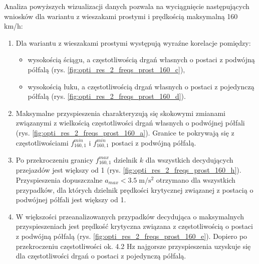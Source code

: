Analiza powyższych wizualizacji danych pozwala na wyciągnięcie następujących wniosków dla wariantu z wieszakami prostymi i prędkością maksymalną 160 km/h:
\begin{enumerate}
	
	\item Dla wariantu z wieszakami prostymi występują wyraźne korelacje pomiędzy:
	\begin{itemize}
		\item wysokością ściągu, a częstotliwością drgań własnych o postaci z podwójną półfalą (rys. \ref{fig:opti_res_2_freqs_prost_160_c}),
		\item wysokością łuku, a częstotliwością drgań własnych o postaci z pojedynczą półfalą (rys. \ref{fig:opti_res_2_freqs_prost_160_d}).
	\end{itemize}
	\item Maksymalne przyspieszenia charakteryzują się skokowymi zmianami związanymi z wielkością częstotliwości drgań własnych o podwójnej półfali (rys. \ref{fig:opti_res_2_freqs_prost_160_a}). Granice te pokrywają się z częstotliwościami $f_{160,1}^{min}$ i $f_{160,1}^{min}$ postaci z podwójną półfalą. 
	\item Po przekroczeniu granicy $f_{160,1}^{max}$  dzielnik $k$ dla wszystkich decydujących przejazdów jest większy od 1 (rys. \ref{fig:opti_res_2_freqs_prost_160_h}). Przyspieszenia dopuszczalne ${a_{max}<3.5\;\mathrm{m/s^2}}$ otrzymano dla wszystkich przypadków, dla których dzielnik prędkości krytycznej związanej z postacią o podwójnej półfali jest większy od 1. 
	
	\item W większości przeanalizowanych przypadków decydująca o maksymalnych przyspieszeniach jest prędkość krytyczna związana z częstotliwością o postaci z podwójną półfalą (rys. \ref{fig:opti_res_2_freqs_prost_160_e}). Dopiero po przekroczeniu częstotliwości ok. 4.2 Hz najgorsze przyspieszenia uzyskuje się dla częstotliwości drgań o postaci z pojedynczą półfalą.

\end{enumerate}
\vfill

